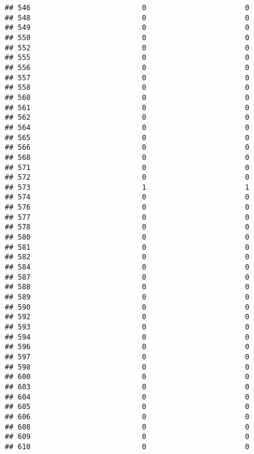 \documentclass[
]{article}
\begin{document}
\begin{verbatim}
## 546                          0                       0
## 548                          0                       0
## 549                          0                       0
## 550                          0                       0
## 552                          0                       0
## 555                          0                       0
## 556                          0                       0
## 557                          0                       0
## 558                          0                       0
## 560                          0                       0
## 561                          0                       0
## 562                          0                       0
## 564                          0                       0
## 565                          0                       0
## 566                          0                       0
## 568                          0                       0
## 571                          0                       0
## 572                          0                       0
## 573                          1                       1
## 574                          0                       0
## 576                          0                       0
## 577                          0                       0
## 578                          0                       0
## 580                          0                       0
## 581                          0                       0
## 582                          0                       0
## 584                          0                       0
## 587                          0                       0
## 588                          0                       0
## 589                          0                       0
## 590                          0                       0
## 592                          0                       0
## 593                          0                       0
## 594                          0                       0
## 596                          0                       0
## 597                          0                       0
## 598                          0                       0
## 600                          0                       0
## 603                          0                       0
## 604                          0                       0
## 605                          0                       0
## 606                          0                       0
## 608                          0                       0
## 609                          0                       0
## 610                          0                       0

\end{verbatim}
\end{document}
